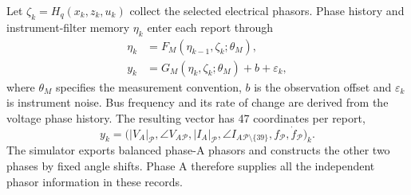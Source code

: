 

Let $\zeta_k=H_q(x_k,z_k,u_k)$ collect the selected electrical phasors.
Phase history and instrument-filter memory $\eta_k$ enter each report
through
\begin{align}
 \eta_k&=F_M(\eta_{k-1},\zeta_k;\theta_M),\nonumber\\
 y_k&=G_M(\eta_k,\zeta_k;\theta_M)+b+\varepsilon_k ,
 \label{eq:narrative-measurement}
\end{align}
where $\theta_M$ specifies the measurement convention, $b$ is the
observation offset and $\varepsilon_k$ is instrument noise. Bus frequency
and its rate of change are derived from the voltage phase history.
The resulting vector has 47 coordinates per report,
\[
 y_k=\big(|V_A|_{\mathcal P},\angle V_A{}_{\mathcal P},
 |I_A|_{\mathcal P},\angle I_A{}_{\mathcal P\setminus\{39\}},
 f_{\mathcal P},\dot f_{\mathcal P}\big)_k .
\]
The simulator exports balanced phase-A phasors and constructs the other
two phases by fixed angle shifts. Phase A therefore supplies all the
independent phasor information in these records.
